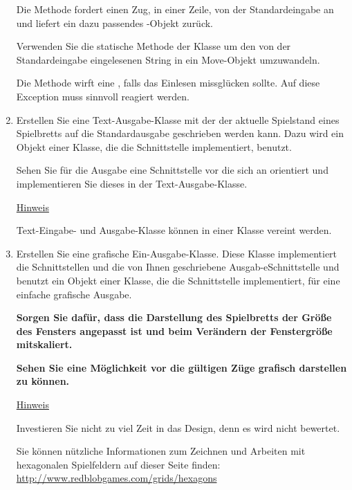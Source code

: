 \begin{enumerate}
Die Methode  fordert einen Zug, in einer Zeile, von der Standardeingabe an und liefert ein dazu passendes -Objekt zurück.

Verwenden Sie die statische Methode  der Klasse  um den von der Standardeingabe eingelesenen String in ein Move-Objekt umzuwandeln.

Die Methode  wirft eine , falls das Einlesen missglücken sollte. Auf diese Exception muss sinnvoll reagiert werden.

\item Erstellen Sie eine Text-Ausgabe-Klasse mit der der aktuelle Spielstand eines Spielbretts auf die Standardausgabe geschrieben werden kann. Dazu wird ein Objekt einer Klasse, die die Schnittstelle  implementiert, benutzt.

Sehen Sie für die Ausgabe eine Schnittstelle vor die sich an  orientiert und implementieren Sie dieses in der Text-Ausgabe-Klasse.

\underline{Hinweis}

Text-Eingabe- und Ausgabe-Klasse können in einer Klasse vereint werden.

\item Erstellen Sie eine grafische Ein-Ausgabe-Klasse. Diese Klasse implementiert die Schnittstellen  und die von Ihnen geschriebene Ausgab-eSchnittstelle und benutzt ein Objekt einer Klasse, die die Schnittstelle  implementiert, für eine einfache grafische Ausgabe.

\textbf{Sorgen Sie dafür, dass die Darstellung des Spielbretts der Größe des Fensters angepasst ist und beim Verändern der Fenstergröße mitskaliert.} \marginpar{\textbf{|}}

\textbf{Sehen Sie eine Möglichkeit vor die gültigen Züge grafisch darstellen zu können.}\marginpar{\textbf{|}}

\underline{Hinweis}

Investieren Sie nicht zu viel Zeit in das Design, denn es wird nicht bewertet.

Sie können nützliche Informationen zum Zeichnen und Arbeiten mit hexagonalen Spielfeldern auf dieser Seite finden: \href{http://www.redblobgames.com/grids/hexagons}{http://www.redblobgames.com/grids/hexagons}


\end{enumerate}
